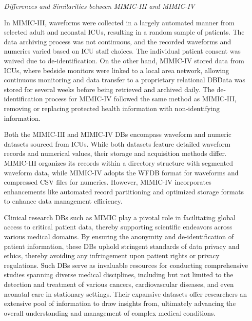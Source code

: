\vspace{1cm}
\textit{Differences and Similarities between MIMIC-III and MIMIC-IV}
\vspace{0.2cm}

In MIMIC-III, waveforms were collected in a largely automated manner from selected adult and neonatal ICUs, resulting in a random sample of patients.
The data archiving process was not continuous, and the recorded waveforms and numerics varied based on ICU staff choices.
The individual patient consent was waived due to de-identification.
On the other hand, MIMIC-IV stored data from ICUs, where bedside monitors were linked to a local area network, allowing continuous monitoring and data transfer to a proprietary relational DB\.
Data was stored for several weeks before being retrieved and archived daily.
The de-identification process for MIMIC-IV followed the same method as MIMIC-III, removing or replacing protected health information with non-identifying information.

Both the MIMIC-III and MIMIC-IV DBs encompass waveform and numeric datasets sourced from ICUs.
While both datasets feature detailed waveform records and numerical values, their storage and acquisition methods differ.
MIMIC-III organizes its records within a directory structure with segmented waveform data, while MIMIC-IV adopts the \ac{WFDB} format for waveforms and compressed \ac{CSV} files for numerics.
However, MIMIC-IV incorporates enhancements like automated record partitioning and optimized storage formats to enhance data management efficiency.

\vspace{0.2cm}

Clinical research DBs such as MIMIC play a pivotal role in facilitating global access to critical patient data, thereby supporting scientific endeavors across various medical domains.
By ensuring the anonymity and de-identification of patient information, these DBs uphold stringent standards of data privacy and ethics, thereby avoiding any infringement upon patient rights or privacy regulations.
Such DBs serve as invaluable resources for conducting comprehensive studies spanning diverse medical disciplines, including but not limited to the detection and treatment of various cancers, cardiovascular diseases, and even neonatal care in stationary settings.
Their expansive datasets offer researchers an extensive pool of information to draw insights from, ultimately advancing the overall understanding and management of complex medical conditions.

